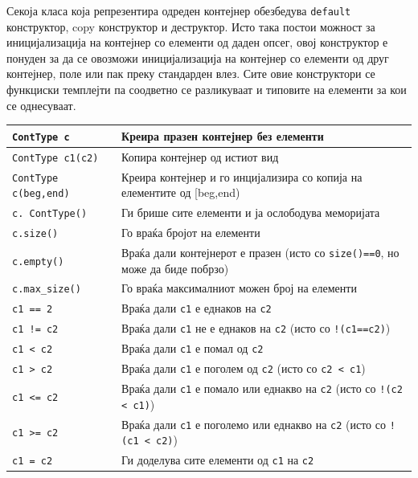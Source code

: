 Секоја класа која репрезентира одреден контејнер обезбедува \texttt{default}
конструктор, copy конструктор и деструктор. Исто така постои можност за
иницијализација на контејнер со елементи од даден опсег, овој конструктор е
понуден за да се овозможи иницијализација на контејнер со елементи од друг
контејнер, поле или пак преку стандарден влез. Сите овие конструктори се
функциски темплејти па соодветно се разликуваат и типовите на елементи за кои се
однесуваат.

\begin{center}
  \begin{tabular}{ | l | p{7cm} |}
    \hline
    \texttt{ContType c} & Креира празен контејнер без елементи \\
    \hline
    \texttt{ContType c1(c2)} & Копира контејнер од истиот вид  \\
    \hline
    \texttt{ContType c(beg,end)} & Креира контејнер и го инцијализира со копија
    на елементите од [beg,end) \\
    \hline
    \texttt{c.~ContType()} & Ги брише сите елементи и ја ослободува меморијата  \\
    \hline
    \texttt{c.size()} & Го враќа бројот на елементи \\
    \hline
    \texttt{c.empty()} & Враќа дали контејнерот е празен (исто со \texttt{size()==0},
    но може да биде побрзо) \\
    \hline
    \texttt{c.max\_size()} & Го враќа максималниот можен број на елементи
    \\
    \hline
    \texttt{c1 == 2} & Враќа дали \texttt{c1} е еднаков на \texttt{c2} \\
    \hline
    \texttt{c1 != c2} & Враќа дали \texttt{c1} не е еднаков на \texttt{c2}
    (исто со \texttt{!(c1==c2)})
    \\
    \hline
    \texttt{c1 < c2} & Враќа дали \texttt{c1} е помал од \texttt{c2} \\
    \hline
    \texttt{c1 > c2} & Враќа дали \texttt{c1} е поголем од \texttt{c2}
    (исто со \texttt{c2 < c1}) \\
    \hline
    \texttt{c1 <= c2} & Враќа дали \texttt{c1} е помало или еднакво на
    \texttt{c2} (исто со \texttt{!(c2 < c1)}) \\
    \hline 
    \texttt{c1 >= c2} & Враќа дали \texttt{c1} е поголемо или еднакво на
    \texttt{c2} (исто со \texttt{!(c1 < c2)}) \\
    \hline
    \texttt{c1 = c2} & Ги доделува сите елементи од \texttt{c1} на \texttt{c2}
    \\

\end{tabular}
\end{center}
